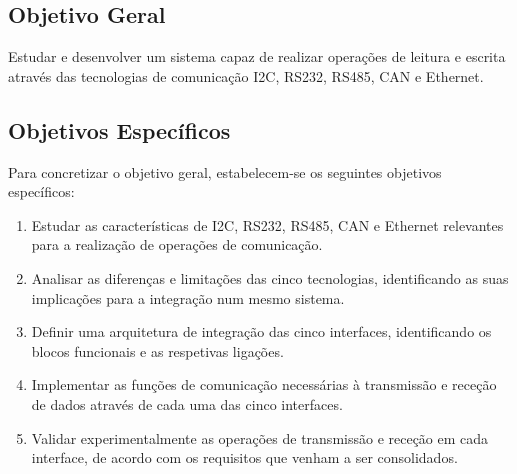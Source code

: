 \subsection{Objetivo Geral}

Estudar e desenvolver um sistema capaz de realizar operações de leitura
e escrita através das tecnologias de comunicação I2C, RS232, RS485,
CAN e Ethernet.

\subsection{Objetivos Específicos}

Para concretizar o objetivo geral, estabelecem-se os seguintes objetivos
específicos:

\begin{enumerate}
    \item Estudar as características de I2C, RS232, RS485, CAN e Ethernet
    relevantes para a realização de operações de comunicação.

    \item Analisar as diferenças e limitações das cinco tecnologias,
    identificando as suas implicações para a integração num mesmo sistema.

    \item Definir uma arquitetura de integração das cinco interfaces,
    identificando os blocos funcionais e as respetivas ligações.

    \item Implementar as funções de comunicação necessárias à transmissão
    e receção de dados através de cada uma das cinco interfaces.

    \item Validar experimentalmente as operações de transmissão e receção
    em cada interface, de acordo com os requisitos que venham a ser
    consolidados.
\end{enumerate}
